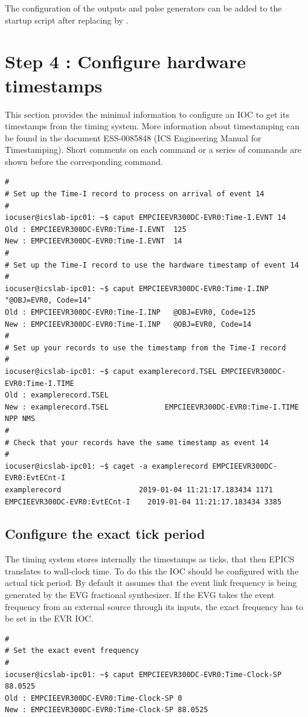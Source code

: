 \documentclass[11pt
  , a4paper
  , article
  , oneside
  , showtrims
]{memoir}
\begin{document}
{The configuration of the outputs and pulse generators can be added to the startup script after  replacing  by .


\section{Step 4 : Configure hardware timestamps}
This section provides the minimal information to configure an IOC to get its timestamps from the timing system. More information about timestamping can be found in the document ESS-0085848 (ICS Engineering Manual for Timestamping). Short comments on each command or a series of commands are shown before the corresponding command.
\begin{lstlisting}[style=termstyle]
#
# Set up the Time-I record to process on arrival of event 14
#
iocuser@icslab-ipc01: ~$ caput EMPCIEEVR300DC-EVR0:Time-I.EVNT 14
Old : EMPCIEEVR300DC-EVR0:Time-I.EVNT  125
New : EMPCIEEVR300DC-EVR0:Time-I.EVNT  14
#
# Set up the Time-I record to use the hardware timestamp of event 14
#
iocuser@icslab-ipc01: ~$ caput EMPCIEEVR300DC-EVR0:Time-I.INP "@OBJ=EVR0, Code=14"
Old : EMPCIEEVR300DC-EVR0:Time-I.INP   @OBJ=EVR0, Code=125
New : EMPCIEEVR300DC-EVR0:Time-I.INP   @OBJ=EVR0, Code=14
#
# Set up your records to use the timestamp from the Time-I record
#
iocuser@icslab-ipc01: ~$ caput examplerecord.TSEL EMPCIEEVR300DC-EVR0:Time-I.TIME
Old : examplerecord.TSEL
New : examplerecord.TSEL             EMPCIEEVR300DC-EVR0:Time-I.TIME NPP NMS
#
# Check that your records have the same timestamp as event 14
#
iocuser@icslab-ipc01: ~$ caget -a examplerecord EMPCIEEVR300DC-EVR0:EvtECnt-I
examplerecord                  2019-01-04 11:21:17.183434 1171
EMPCIEEVR300DC-EVR0:EvtECnt-I    2019-01-04 11:21:17.183434 3385
\end{lstlisting}

\subsection{Configure the exact tick period}
The timing system stores internally the timestamps as ticks, that then EPICS translates to wall-clock time. To do this the IOC should be configured with the actual tick period. By default it assumes that the event link frequency is being generated by the EVG fractional synthesizer. If the EVG takes the event frequency from an external source through its inputs, the exact frequency has to be set in the EVR IOC.
\begin{lstlisting}[style=termstyle]
#
# Set the exact event frequency
#
iocuser@icslab-ipc01: ~$ caput EMPCIEEVR300DC-EVR0:Time-Clock-SP 88.0525
Old : EMPCIEEVR300DC-EVR0:Time-Clock-SP 0
New : EMPCIEEVR300DC-EVR0:Time-Clock-SP 88.0525
\end{lstlisting}


}
\end{document}
